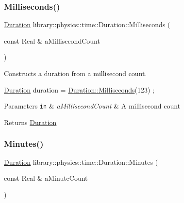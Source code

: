 \subsubsection{\texorpdfstring{Milliseconds()}{Milliseconds()}}
{\footnotesize\ttfamily \hyperlink{classlibrary_1_1physics_1_1time_1_1_duration}{Duration} library\+::physics\+::time\+::\+Duration\+::\+Milliseconds (\begin{DoxyParamCaption}\item[{const Real \&}]{a\+Millisecond\+Count }\end{DoxyParamCaption})\hspace{0.3cm}{\ttfamily [static]}}



Constructs a duration from a millisecond count. 


\begin{DoxyCode}
\hyperlink{classlibrary_1_1physics_1_1time_1_1_duration_a0a70efcf487a841da572afcf00001f64}{Duration} duration = \hyperlink{classlibrary_1_1physics_1_1time_1_1_duration_ab6eab798898a96019a8c944cd565e161}{Duration::Milliseconds}(123) ;
\end{DoxyCode}



\begin{DoxyParams}[1]{Parameters}
\mbox{\tt in}  & {\em a\+Millisecond\+Count} & A millisecond count \\
\hline
\end{DoxyParams}
\begin{DoxyReturn}{Returns}
\hyperlink{classlibrary_1_1physics_1_1time_1_1_duration}{Duration} 
\end{DoxyReturn}
\mbox{\label{classlibrary_1_1physics_1_1time_1_1_duration_ad7171befa3075e796bfb02a7542dacdd}} 
\subsubsection{\texorpdfstring{Minutes()}{Minutes()}}
{\footnotesize\ttfamily \hyperlink{classlibrary_1_1physics_1_1time_1_1_duration}{Duration} library\+::physics\+::time\+::\+Duration\+::\+Minutes (\begin{DoxyParamCaption}\item[{const Real \&}]{a\+Minute\+Count }\end{DoxyParamCaption})\hspace{0.3cm}{\ttfamily [static]}}



